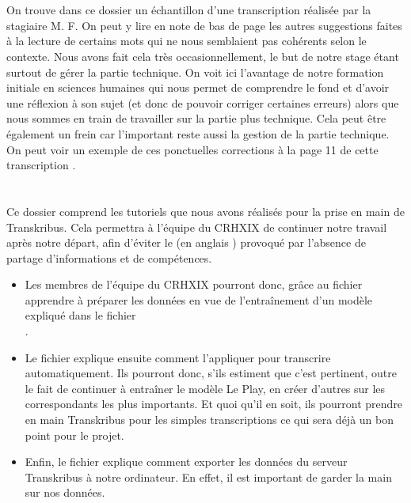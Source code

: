 \section{}

On trouve dans ce dossier un échantillon d'une transcription réalisée par la stagiaire M. F. On peut y lire en note de bas de page les autres suggestions faites à la lecture de certains mots qui ne nous semblaient pas cohérents selon le contexte. 
Nous avons fait cela très occasionnellement, le but de notre stage étant surtout de gérer la partie technique. On voit ici l'avantage de notre formation initiale en sciences humaines qui nous permet de comprendre le fond et d'avoir une réflexion à son sujet (et donc de pouvoir corriger certaines erreurs) alors que nous sommes en train de travailler sur la partie plus technique. Cela peut être également un frein car l'important reste aussi la gestion de la partie technique.
On peut voir un exemple de ces ponctuelles corrections à la page 11 de cette transcription .

\section{}

Ce dossier comprend les tutoriels que nous avons réalisés pour la prise en main de Transkribus.
Cela permettra à l'équipe du CRHXIX de continuer notre travail après notre départ, afin d'éviter le  (en anglais ) provoqué par l'absence de partage d'informations et de compétences.

\begin{itemize}
    \item Les membres de l'équipe du CRHXIX pourront donc, grâce au fichier\\  apprendre à préparer les données en vue de l'entraînement d'un modèle expliqué dans le fichier\\ .
    \item Le fichier  explique ensuite comment l'appliquer pour transcrire automatiquement.
Ils pourront donc, s'ils estiment que c'est pertinent, outre le fait de continuer à entraîner le modèle Le Play, en créer d'autres sur les correspondants les plus importants.
Et quoi qu'il en soit, ils pourront prendre en main Transkribus pour les simples transcriptions ce qui sera déjà un bon point pour le projet.
\item Enfin, le fichier  explique comment exporter les données du serveur Transkribus à notre ordinateur. En effet, il est important de garder la main sur nos données.
\end{itemize}


